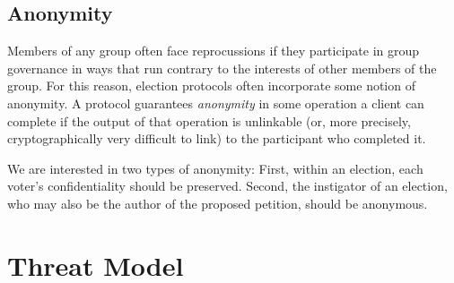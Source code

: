 \subsection{Anonymity}
Members of any group often face reprocussions if they participate in group
governance in ways that run contrary to the interests of other members of
the group. For this reason, election protocols often incorporate some notion
of anonymity. A protocol guarantees \emph{anonymity} in some operation a
client can complete if the output of that operation is unlinkable (or, more
precisely, cryptographically very difficult to link) to the participant who
completed it\cite{ford_hiding_2014}.

We are interested in two types of anonymity: First, within an election,
each voter's confidentiality should be preserved. Second, the instigator of an
election, who may also be the author of the proposed petition, should be
anonymous.

\section{Threat Model}

